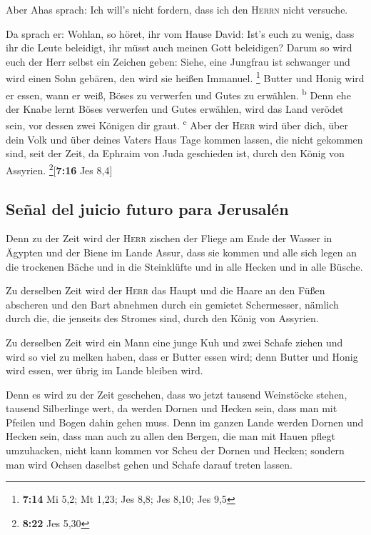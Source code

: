  Aber Ahas sprach: Ich will's nicht fordern, dass ich den
\textsc{Herrn} nicht versuche.

 Da sprach er: Wohlan, so höret, ihr vom Hause David:
Ist's euch zu wenig, dass ihr die Leute beleidigt, ihr müsst auch meinen
Gott beleidigen?  Darum so wird euch der Herr selbst ein
Zeichen geben: Siehe, eine Jungfrau ist schwanger und wird einen Sohn
gebären, den wird sie heißen Immanuel. \footnote{\textbf{7:14} Mi 5,2;
  Mt 1,23; Jes 8,8; Jes 8,10; Jes 9,5}  Butter und Honig
wird er essen, wann er weiß, Böses zu verwerfen und Gutes zu erwählen.
\textsuperscript{b}  Denn ehe der Knabe lernt Böses
verwerfen und Gutes erwählen, wird das Land verödet sein, vor dessen
zwei Königen dir graut. \textsuperscript{c}  Aber der
\textsc{Herr} wird über dich, über dein Volk und über deines Vaters Haus
Tage kommen lassen, die nicht gekommen sind, seit der Zeit, da Ephraim
von Juda geschieden ist, durch den König von Assyrien.
\footnote{\textbf{8:22} Jes 5,30}{[}\textbf{7:16} Jes 8,4{]}

\hypertarget{seuxf1al-del-juicio-futuro-para-jerusaluxe9n}{%
\subsection{Señal del juicio futuro para
Jerusalén}\label{seuxf1al-del-juicio-futuro-para-jerusaluxe9n}}

 Denn zu der Zeit wird der \textsc{Herr} zischen der
Fliege am Ende der Wasser in Ägypten und der Biene im Lande Assur,
 dass sie kommen und alle sich legen an die trockenen
Bäche und in die Steinklüfte und in alle Hecken und in alle Büsche.

 Zu derselben Zeit wird der \textsc{Herr} das Haupt und
die Haare an den Füßen abscheren und den Bart abnehmen durch ein
gemietet Schermesser, nämlich durch die, die jenseits des Stromes sind,
durch den König von Assyrien.

 Zu derselben Zeit wird ein Mann eine junge Kuh und zwei
Schafe ziehen  und wird so viel zu melken haben, dass er
Butter essen wird; denn Butter und Honig wird essen, wer übrig im Lande
bleiben wird.

 Denn es wird zu der Zeit geschehen, dass wo jetzt
tausend Weinstöcke stehen, tausend Silberlinge wert, da werden Dornen
und Hecken sein,  dass man mit Pfeilen und Bogen dahin
gehen muss. Denn im ganzen Lande werden Dornen und Hecken sein,
 dass man auch zu allen den Bergen, die man mit Hauen
pflegt umzuhacken, nicht kann kommen vor Scheu der Dornen und Hecken;
sondern man wird Ochsen daselbst gehen und Schafe darauf treten lassen.

